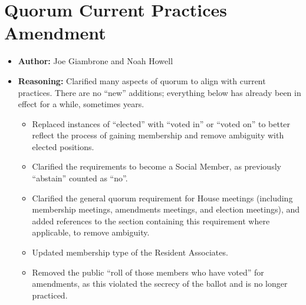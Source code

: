 \documentclass[10pt]{article} %
\begin{document}
\section{Quorum Current Practices Amendment}
\begin{itemize}
    \item \textbf{Author:} Joe Giambrone and Noah Howell 
    \item \textbf{Reasoning:} Clarified many aspects of quorum to align with current practices. There are no ``new'' additions; everything below has already been in effect for a while, sometimes years.
    \begin{itemize}
        \item Replaced instances of ``elected'' with ``voted in'' or ``voted on'' to better reflect the process of gaining membership and remove ambiguity with elected positions.
        \item Clarified the requirements to become a Social Member, as previously ``abstain'' counted as ``no''.
        \item Clarified the general quorum requirement for House meetings (including membership meetings, amendments meetings, and election meetings), and added references to the section containing this requirement where applicable, to remove ambiguity.
        \item Updated membership type of the Resident Associates.
        \item Removed the public ``roll of those members who have voted'' for amendments, as this violated the secrecy of the ballot and is no longer practiced.
    \end{itemize}
    

\end{itemize}
\end{document}
